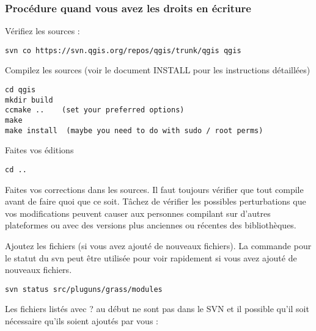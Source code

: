 \subsubsection{Procédure quand vous avez les droits en écriture}
Vérifiez les sources :

\begin{verbatim}
svn co https://svn.qgis.org/repos/qgis/trunk/qgis qgis
\end{verbatim}

Compilez les sources (voir le document INSTALL pour les instructions détaillées)

\begin{verbatim}
cd qgis
mkdir build
ccmake ..    (set your preferred options)
make
make install  (maybe you need to do with sudo / root perms)
\end{verbatim}

Faites vos éditions

\begin{verbatim}
cd ..
\end{verbatim}

Faites vos corrections dans les sources. Il faut toujours vérifier que tout compile avant de faire quoi que ce soit. Tâchez de vérifier les possibles perturbations que vos modifications peuvent causer aux personnes compilant sur d'autres plateformes ou avec des versions plus anciennes ou récentes des bibliothèques.

Ajoutez les fichiers (si vous avez ajouté de nouveaux fichiers). La commande pour le statut du svn peut être utilisée pour voir rapidement si vous avez ajouté de nouveaux fichiers.

\begin{verbatim}
svn status src/pluguns/grass/modules
\end{verbatim}

Les fichiers listés avec ? au début ne sont pas dans le SVN et il possible qu'il soit nécessaire qu'ils soient ajoutés par vous :

